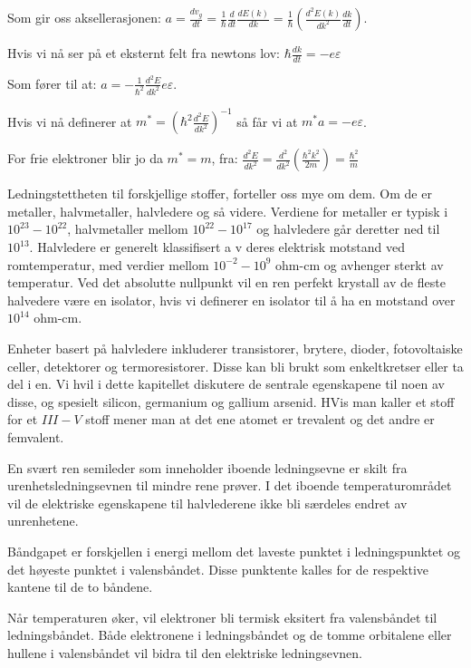 \documentclass{article}
\begin{document}
Som gir oss aksellerasjonen: $a = \frac{d v_g}{dt} = \frac{1}{\hbar} \frac{d}{dt} \frac{dE(k)}{dk} = \frac{1}{\hbar}\left (\frac{d^2 E(k)}{dk^2} \frac{dk}{dt}\right)$.

Hvis vi nå ser på et eksternt felt fra newtons lov: $\hbar \frac{dk}{dt} = -e \varepsilon$

Som fører til at: $a = -\frac{1}{\hbar^2} \frac{d^2 E}{dk^2} e \varepsilon$.

Hvis vi nå definerer at $m^* = \left(\hbar^2 \frac{d^2 E}{dk^2}\right)^{-1}$ så får vi at $m^*a=-e\varepsilon$.

For frie elektroner blir jo da $m^* = m$, fra: $\frac{d^2 E}{dk^2} = \frac{d^2}{dk^2} \left(\frac{\hbar^2 k^2}{2m}\right) = \frac{\hbar^2}{m}$

\nyside
{}
Ledningstettheten til forskjellige stoffer, forteller oss mye om dem. Om de er metaller, halvmetaller, halvledere og så videre. Verdiene for metaller er typisk i $10^{23}-10^{22}$, halvmetaller mellom $10^{22} - 10^{17}$ og halvledere går deretter ned til $10^{13}$. Halvledere er generelt klassifisert a v deres elektrisk motstand ved romtemperatur, med verdier mellom $10^{-2} - 10^9$ ohm-cm og avhenger sterkt av temperatur. Ved det absolutte nullpunkt vil en ren perfekt krystall av de fleste halvedere være en isolator, hvis vi definerer en isolator til å ha en motstand over $10^{14}$ ohm-cm.

Enheter basert på halvledere inkluderer transistorer, brytere, dioder, fotovoltaiske celler, detektorer og termoresistorer. Disse kan bli brukt som enkeltkretser eller ta del i en. Vi hvil i dette kapitellet diskutere de sentrale egenskapene til noen av disse, og spesielt silicon, germanium og gallium arsenid. HVis man kaller et stoff for et $III-V$ stoff mener man at det ene atomet er trevalent og det andre er femvalent.

En svært ren semileder som inneholder iboende ledningsevne er skilt fra urenhetsledningsevnen til mindre rene prøver. I det iboende temperaturområdet vil  de elektriske egenskapene til halvlederene ikke bli særdeles endret av unrenhetene.

Båndgapet er forskjellen i energi mellom det laveste punktet i ledningspunktet og det høyeste punktet i valensbåndet. Disse punktente kalles for de respektive kantene til de to båndene.

Når temperaturen øker, vil elektroner bli termisk eksitert fra valensbåndet til ledningsbåndet. Både elektronene i ledningsbåndet og de tomme orbitalene eller hullene i valensbåndet vil bidra til den elektriske ledningsevnen.
\end{document}
